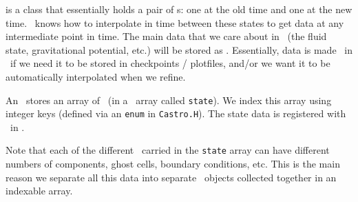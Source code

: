 \code{\statedata} is a class that essentially holds a pair of \multifab s: one
at the old time and one at the new time.  \boxlib\ knows how to
interpolate in time between these states to get data at any
intermediate point in time.  The main data that we care about in
\castro\ (the fluid state, gravitational potential, etc.) will be
stored as \statedata.  Essentially, data is made \statedata\ in
\castro\ if we need it to be stored in checkpoints / plotfiles, and/or
we want it to be automatically interpolated when we refine.

An \amrlevel\ stores an array of \statedata\ (in a \cpp\ array
called {\tt state}).  We index this array using integer keys (defined
via an {\tt enum} in {\tt Castro.H}).  The state data is registered
with \boxlib\ in .

Note that each of the different \statedata\ carried in the {\tt state}
array can have different numbers of components, ghost cells, boundary
conditions, etc.  This is the main reason we separate all this data
into separate \statedata\ objects collected together in an indexable
array.

